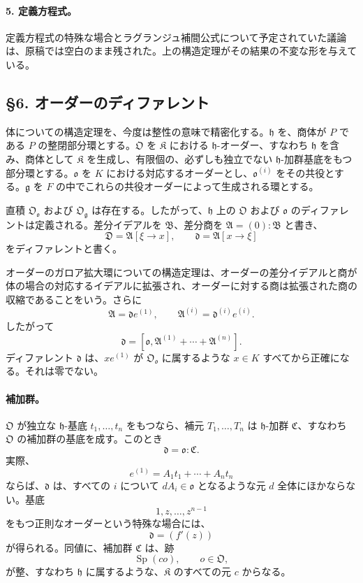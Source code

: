 \paragraph{5. 定義方程式。}
定義方程式の特殊な場合とラグランジュ補間公式について予定されていた議論は、原稿では空白のまま残された。上の構造定理がその結果の不変な形を与えている。

\subsection*{§6. オーダーのディファレント}

体についての構造定理を、今度は整性の意味で精密化する。\(\mathfrak h\) を、商体が \(P\) である \(P\) の整閉部分環とする。\(\mathfrak O\) を \(\mathfrak K\) における \(\mathfrak h\)-オーダー、すなわち \(\mathfrak h\) を含み、商体として \(\mathfrak K\) を生成し、有限個の、必ずしも独立でない \(\mathfrak h\)-加群基底をもつ部分環とする。\(\mathfrak o\) を \(K\) における対応するオーダーとし、\(\mathfrak o^{(i)}\) をその共役とする。\(\mathfrak g\) を \(F\) の中でこれらの共役オーダーによって生成される環とする。

直積 \(\mathfrak O_{\mathfrak o}\) および \(\mathfrak O_{\mathfrak g}\) は存在する。したがって、\(\mathfrak h\) 上の \(\mathfrak O\) および \(\mathfrak o\) のディファレントは定義される。差分イデアルを \(\mathfrak B\)、差分商を \(\mathfrak A=(0):\mathfrak B\) と書き、
\[
        \mathfrak D=\mathfrak A[\xi\to x],
        \qquad
        \mathfrak d=\mathfrak A[x\to\xi]
\]
をディファレントと書く。

オーダーのガロア拡大環についての構造定理は、オーダーの差分イデアルと商が体の場合の対応するイデアルに拡張され、オーダーに対する商は拡張された商の収縮であることをいう。さらに
\[
        \mathfrak A=\mathfrak d e^{(1)},
        \qquad
        \mathfrak A^{(i)}=\mathfrak d^{(i)}e^{(i)}.
\]
したがって
\[
        \mathfrak d=[\mathfrak o,
        \mathfrak A^{(1)}+
        \cdots+\mathfrak A^{(n)}].
\]
ディファレント \(\mathfrak d\) は、\(xe^{(1)}\) が \(\mathfrak O_{\mathfrak o}\) に属するような \(x\in K\) すべてから正確になる。それは零でない。

\paragraph{補加群。}
\(\mathfrak O\) が独立な \(\mathfrak h\)-基底 \(t_1,\ldots,t_n\) をもつなら、補元 \(T_1,\ldots,T_n\) は \(\mathfrak h\)-加群 \(\mathfrak C\)、すなわち \(\mathfrak O\) の補加群の基底を成す。このとき
\[
        \mathfrak d=\mathfrak o:\mathfrak C.
\]
実際、
\[
        e^{(1)}=A_1t_1+
        \cdots+A_nt_n
\]
ならば、\(\mathfrak d\) は、すべての \(i\) について \(dA_i\in\mathfrak o\) となるような元 \(d\) 全体にほかならない。基底
\[
        1,z,\ldots,z^{n-1}
\]
をもつ正則なオーダーという特殊な場合には、
\[
        \mathfrak d=(f'(z))
\]
が得られる。同値に、補加群 \(\mathfrak C\) は、跡
\[
        \operatorname{Sp}(co),\qquad o\in\mathfrak O,
\]
が整、すなわち \(\mathfrak h\) に属するような、\(\mathfrak K\) のすべての元 \(c\) からなる。

